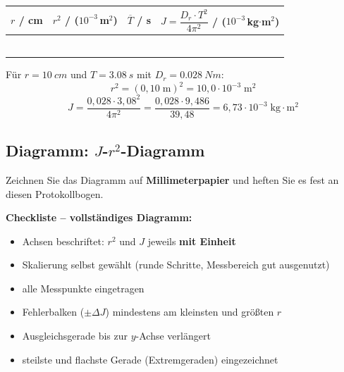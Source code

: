 \documentclass[11pt,a4paper]{scrartcl}
\begin{document}
\begin{center}
	\renewcommand{\arraystretch}{2.2}
	\begin{tabular}{|c|c|c|c|}
		\hline
		$r$ / cm & $r^2$ / ($10^{-3}\,$m$^2$) & $\overline{T}$ / s & $J = \dfrac{D_r \cdot T^2}{4\pi^2}$ / ($10^{-3}\,$kg$\cdot$m$^2$) \\
		\hline
		& & & \\
		\hline
		& & & \\
		\hline
		& & & \\
		\hline
		& & & \\
		\hline
		& & & \\
		\hline
		& & & \\
		\hline
	\end{tabular}
\end{center}

\begin{hilfebox}[title={\faIcon{lightbulb} Rechenbeispiel}]
	Für $r = \SI{10}{cm}$ und $T = \SI{3,08}{s}$ mit $D_r = \SI{0,028}{Nm}$:
	\[
	r^2 = (0{,}10\;\text{m})^2 = 10{,}0 \cdot 10^{-3}\;\text{m}^2
	\]
	\[
	J = \frac{0{,}028 \cdot 3{,}08^2}{4\pi^2} = \frac{0{,}028 \cdot 9{,}486}{39{,}48} = 6{,}73 \cdot 10^{-3}\;\text{kg}\cdot\text{m}^2
	\]
\end{hilfebox}

\newpage
\subsection*{Diagramm: $J$-$r^2$-Diagramm}

\begin{tcolorbox}[colback=blue!4, colframe=black, boxrule=0.6pt, title={\faIcon{ruler-combined}\enspace $J$-$r^2$-Diagramm auf Millimeterpapier}, fonttitle=\bfseries]
	Zeichnen Sie das Diagramm auf \textbf{Millimeterpapier} und heften Sie es fest an diesen Protokollbogen.

	\textbf{Checkliste -- vollständiges Diagramm:}
	\begin{itemize}
		\item Achsen beschriftet: $r^2$ und $J$ jeweils \textbf{mit Einheit}
		\item Skalierung selbst gewählt (runde Schritte, Messbereich gut ausgenutzt)
		\item alle Messpunkte eingetragen
		\item Fehlerbalken ($\pm\Delta J$) mindestens am kleinsten und größten $r$
		\item Ausgleichsgerade bis zur $y$-Achse verlängert
		\item steilste und flachste Gerade (Extremgeraden) eingezeichnet
	\end{itemize}
\end{tcolorbox}
\end{document}
